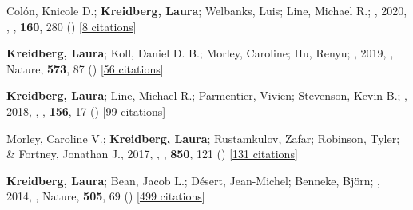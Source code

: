 \documentclass[12pt,letterpaper]{article}
\begin{document}
\begin{list}{}{\cvlist}
\item[{\color{numcolor}\scriptsize5}] Col{\'o}n, Knicole D.; \textbf{Kreidberg, Laura}; Welbanks, Luis; Line, Michael R.; \etal, 2020, , \aj, \textbf{160}, 280 () [\href{https://ui.adsabs.harvard.edu/abs/2020AJ....160..280C}{8 citations}]

\item[{\color{numcolor}\scriptsize4}] \textbf{Kreidberg, Laura}; Koll, Daniel D. B.; Morley, Caroline; Hu, Renyu; \etal, 2019, , Nature, \textbf{573}, 87 () [\href{https://ui.adsabs.harvard.edu/abs/2019Natur.573...87K}{56 citations}]

\item[{\color{numcolor}\scriptsize3}] \textbf{Kreidberg, Laura}; Line, Michael R.; Parmentier, Vivien; Stevenson, Kevin B.; \etal, 2018, , \aj, \textbf{156}, 17 () [\href{https://ui.adsabs.harvard.edu/abs/2018AJ....156...17K}{99 citations}]

\item[{\color{numcolor}\scriptsize2}] Morley, Caroline V.; \textbf{Kreidberg, Laura}; Rustamkulov, Zafar; Robinson, Tyler; \& Fortney, Jonathan J., 2017, , \apj, \textbf{850}, 121 () [\href{https://ui.adsabs.harvard.edu/abs/2017ApJ...850..121M}{131 citations}]

\item[{\color{numcolor}\scriptsize1}] \textbf{Kreidberg, Laura}; Bean, Jacob L.; D{\'e}sert, Jean-Michel; Benneke, Bj{\"o}rn; \etal, 2014, , Nature, \textbf{505}, 69 () [\href{https://ui.adsabs.harvard.edu/abs/2014Natur.505...69K}{499 citations}]

\end{list}
\end{document}
